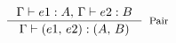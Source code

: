\documentclass[preview]{standalone}
\begin{document}
$\inference {\Gamma \vdash e1 : A, \, \Gamma \vdash e2 : B}{\Gamma \vdash (e1, \, e2) : (A, \, B)}[Pair]$
\end{document}
